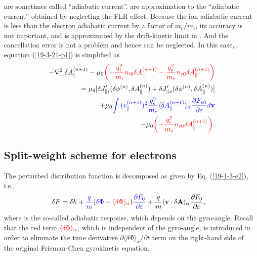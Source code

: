 \documentclass{article}
\newcommand{\tmcolor}[2]{{\color{#1}{#2}}}
\newcommand{\tmtexttt}[1]{\text{{\ttfamily{#1}}}}
\begin{document}
\tmcolor{blue}{The blue terms} are sometimes called ``adiabatic current''.
\tmcolor{red}{The red terms} are approximation to the ``adiabatic current''
obtained by neglecting the FLR effect. Because the ion adiabatic current is
less than the electron adiabatic current by a factor of $m_e / m_i$, its
accuracy is not important, and is approximated by the drift-kinetic limit in
\tmtexttt{GEM}. And the cancellation error is not a problem and hence can be
neglected. In this case, equation (\ref{19-3-21-p1}) is simplified as
\begin{eqnarray}
  &  & - \nabla^2_{\perp} \delta A_{\parallel}^{(n + 1)} - \mu_0
  \tmcolor{red}{\left( - \frac{q^2_i}{m_i} n_{i 0} \delta A_{\parallel}^{(n +
  1)} - \frac{q^2_e}{m_e} n_{e 0} \delta A_{\parallel}^{(n + 1)} \right)}
  \nonumber\\
  &  & = \mu_0 [\delta J_{\parallel i}' (\delta \phi^{(n)}, \delta
  A_{\parallel}^{(n)}) + \delta J'_{||e} (\delta \phi^{(n)}, \delta
  A_{\parallel}^{(n)})] \nonumber\\
  &  & + \mu_0 \tmcolor{blue}{\int {(v_{\parallel}^{(n + 1)})^2} 
  \frac{q^2_e}{m_e} \langle \delta A_{\parallel}^{(n + 1)} \rangle_{\alpha}
  \frac{\partial F_{e 0}}{\partial \varepsilon} d\mathbf{v}} \nonumber\\
  &  & - \mu_0 \tmcolor{red}{\left( - \frac{q^2_e}{m_e} n_{e 0} \delta
  A_{\parallel}^{(n + 1)} \right)} .  \label{19-3-25-p1}
\end{eqnarray}


\subsection{Split-weight scheme for electrons}

The perturbed distribution function is decomposed as given by Eq.
(\ref{19-1-3-e2}), i.e.,
\begin{equation}
  \label{22-11-13-e2} \delta F = \delta h + \tmcolor{blue}{\frac{q}{m}}
  (\tmcolor{blue}{\delta \Phi} - \tmcolor{red}{\langle \delta \Phi
  \rangle_{\alpha}}) \tmcolor{blue}{\frac{\partial F_0}{\partial \varepsilon}}
  + \frac{q}{m} \langle \mathbf{v} \cdot \delta \mathbf{A} \rangle_{\alpha}
  \frac{\partial F_0}{\partial \varepsilon},
\end{equation}
where \tmcolor{blue}{the term in blue} is the so-called adiabatic response,
which depends on the gyro-angle. Recall that the red term
$\tmcolor{red}{\langle \delta \Phi \rangle_{\alpha}}$, which is independent of
the gyro-angle, is introduced in order to eliminate the time derivative
$\partial \langle \delta \Phi \rangle_{\alpha} / \partial t$ term on the
right-hand side of the original Frieman-Chen gyrokinetic equation.
\end{document}
